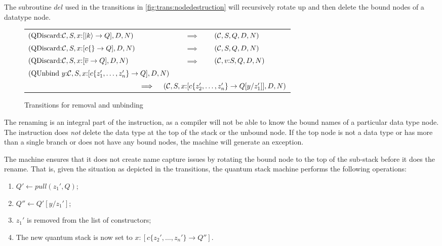 The subroutine $del$ used in the transitions 
in \ref{fig:trans:nodedestruction}
will recursively rotate up and then delete the bound nodes of a datatype
 node.


\begin{figure}[htbp]
\begin{tabular}{lll}
$(\mathrm{QDiscard}{:}\mathcal{C},S,x{:}[\left\vert{k}\right\rangle\to Q],D,N) $&$ \implies$&$ (\mathcal{C},S,Q,D,N)$ \\[12pt]
$(\mathrm{QDiscard}{:}\mathcal{C},S,x{:}[c\{\} \to Q],D,N) $&$\implies $&$(\mathcal{C},S,Q,D,N)$ \\[12pt]
$(\mathrm{QDiscard}{:}\mathcal{C},S,x{:}[\overline{v} \to Q],D,N) $&$\implies$&$ (\mathcal{C},v{:}S,Q,D,N)$ \\[12pt]
\multicolumn{3}{l}{$(\mathrm{QUnbind}\ y{:}\cd,S,x{:}[c\{z_1',\ldots,z_n'\}\to Q],D,N) $} \\
\multicolumn{3}{r}{$\trspacefour\trspacethree\quad\ \ \implies\ \ \ (\cd,S,x{:}[c\{z_2',\ldots,z_n'\} \to Q[y/z_1']],D,N)$}
\end{tabular}
\caption{Transitions for removal and unbinding}\label{fig:trans:noderemoval}
\end{figure}



 The 
renaming is an integral part of the 
instruction, as a compiler will not be able to know  the bound names of
a particular data type node. The instruction 
does \emph{not} delete the data type at the top of the stack or
the unbound node. If the top node is not a data type or has more than
a single branch or does not 
have any bound nodes, the machine will generate an exception. 

The machine ensures that it does not create  name capture issues
by rotating the bound node to the top of the sub-stack before
it does the rename. That is, given the situation as depicted in
the transitions, the quantum stack machine performs the 
following operations:

{\begin{singlespace}
\begin{enumerate}
\item{} $ Q' \leftarrow pull(z_1',Q)$;
\item{} $ Q'' \leftarrow  Q'[y/z_1'] $;
\item{} $z_1'$ is removed from the list of constructors;
\item{} The new quantum stack is now set to $x{:}[c\{z_2',\ldots,z_n'\} \to Q'']$.
\end{enumerate}
\end{singlespace}
}



